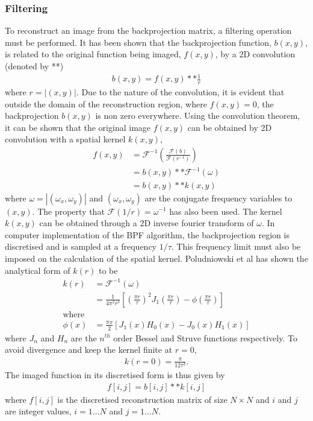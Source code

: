 \documentclass[11pt,a4paper]{article}
\begin{document}
\subsubsection{Filtering}
To reconstruct an image from the backprojection matrix, a filtering operation must be performed. It has been shown that the backprojection function, $b(x,y)$, is related to the original function being imaged, $f(x,y)$, by a 2D convolution (denoted by **) \cite{zeng1994backprojection}
\begin{eqnarray}
b(x,y) = f(x,y) ** \frac{1}{r}
\end{eqnarray}
where $r = |(x,y)|$. Due to the nature of the convolution, it is evident that outside the domain of the reconstruction region, where $f(x,y) = 0$, the backprojection $b(x,y)$ is non zero everywhere. Using the convolution theorem, it can be shown that the original image $f(x,y)$ can be obtained by 2D convolution with a spatial kernel $k(x,y)$,
\begin{align}
f(x,y) & = \mathcal{F}^{-1}\left(\frac{\mathcal{F}(b)}{\mathcal{F}(r^{-1})}\right) \\
& = b(x,y) ** \mathcal{F}^{-1}(\omega) \\
& = b(x,y) ** k(x,y)
\end{align}
where $\omega = |(\omega_x,\omega_y)|$ and $(\omega_x,\omega_y)$ are the conjugate frequency variables to $(x,y)$. The property that $\mathcal{F}(1/r) = \omega^{-1}$ has also been used. The kernel $k(x,y)$ can be obtained through a 2D inverse fourier transform of $\omega$. In computer implementation of the BPF algorithm, the backprojection region is discretised and is sampled at a frequency $1/\tau$. This frequency limit must also be imposed on the calculation of the spatial kernel. Poludniowski et al \cite{poludniowski2014proton} has shown the analytical form of $k(r)$ to be
\begin{align}
k(r) & = \mathcal{F}^{-1}(\omega) \\
& = \frac{1}{4\pi^2r^3}\left[\left(\frac{\pi r}{\tau}\right)^2 J_1\left(\frac{\pi r}{\tau}\right) - \phi\left(\frac{\pi r}{\tau}\right)\right] \\
\text{where} & \\
\phi(x) & = \frac{\pi x}{2} [ J_1(x) H_0(x) - J_0(x) H_1(x)]
\end{align}
where $J_n$ and $H_{n}$ are the $n^{th}$ order Bessel and Struve functions respectively. To avoid divergence and keep the kernel finite at $r = 0$, 
\begin{align}
k(r=0) = \frac{\pi}{12\tau^3}.
\end{align}
The imaged function in its discretised form is thus given by
\begin{eqnarray}
f[i,j] = b[i,j] ** k[i,j] 
\label{eq:bpconv}
\end{eqnarray}
where $f[i,j]$ is the discretised reconstruction matrix of size $N \times N$ and $i$ and $j$ are integer values, $i = 1 \dots N$  and $j = 1 \dots N$.
\end{document}
